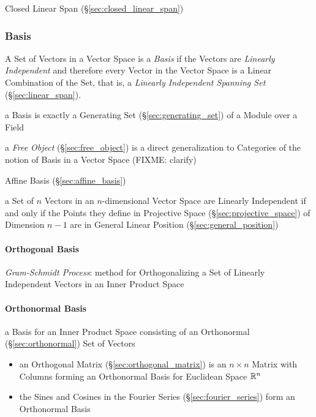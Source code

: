 Closed Linear Span (\S\ref{sec:closed_linear_span})



\subsubsection{Basis}\label{sec:basis}

A Set of Vectors in a Vector Space is a \emph{Basis} if the Vectors are
\emph{Linearly Independent} and therefore every Vector in the Vector Space is a
Linear Combination of the Set, that is, a \emph{Linearly Independent Spanning
  Set} (\S\ref{sec:linear_span}).

a Basis is exactly a Generating Set (\S\ref{sec:generating_set}) of a Module
over a Field

\fist a \emph{Free Object} (\S\ref{sec:free_object}) is a direct generalization
to Categories of the notion of Basis in a Vector Space
(FIXME: clarify)

\fist Affine Basis (\S\ref{sec:affine_basis})

a Set of $n$ Vectors in an $n$-dimensional Vector Space are Linearly
Independent if and only if the Points they define in Projective Space
(\S\ref{sec:projective_space}) of Dimension $n-1$ are in General Linear
Position (\S\ref{sec:general_position})



\paragraph{Orthogonal Basis}\label{sec:orthogonal_basis}\hfill

\emph{Gram-Schmidt Process}: method for Orthogonalizing a Set of Linearly
Independent Vectors in an Inner Product Space



\paragraph{Orthonormal Basis}\label{sec:orthonormal_basis}\hfill

a Basis for an Inner Product Space consisting of an Orthonormal
(\S\ref{sec:orthonormal}) Set of Vectors

\begin{itemize}
  \item an Orthogonal Matrix (\S\ref{sec:orthogonal_matrix}) is an $n \times n$
    Matrix with Columns forming an Orthonormal Basis for Euclidean Space
    $\mathbb{R}^n$
  \item the Sines and Cosines in the Fourier Series
    (\S\ref{sec:fourier_series}) form an Orthonormal Basis
\end{itemize}




